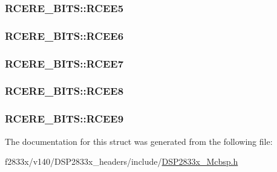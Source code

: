 \subsubsection[{R\+C\+E\+E5}]{ R\+C\+E\+R\+E\+\_\+\+B\+I\+T\+S\+::\+R\+C\+E\+E5}\label{struct_r_c_e_r_e___b_i_t_s_a806259ce4dbf29be106ef42cffc6e0e9}
\hypertarget{struct_r_c_e_r_e___b_i_t_s_a79c31d4b9794743b02e1fb5dcbc0279f}{}
\subsubsection[{R\+C\+E\+E6}]{ R\+C\+E\+R\+E\+\_\+\+B\+I\+T\+S\+::\+R\+C\+E\+E6}\label{struct_r_c_e_r_e___b_i_t_s_a79c31d4b9794743b02e1fb5dcbc0279f}
\hypertarget{struct_r_c_e_r_e___b_i_t_s_a16e0752fe213f6b96f243f046ed6b277}{}
\subsubsection[{R\+C\+E\+E7}]{ R\+C\+E\+R\+E\+\_\+\+B\+I\+T\+S\+::\+R\+C\+E\+E7}\label{struct_r_c_e_r_e___b_i_t_s_a16e0752fe213f6b96f243f046ed6b277}
\hypertarget{struct_r_c_e_r_e___b_i_t_s_a58bd59d712ea07a4440bec076b88b0f7}{}
\subsubsection[{R\+C\+E\+E8}]{ R\+C\+E\+R\+E\+\_\+\+B\+I\+T\+S\+::\+R\+C\+E\+E8}\label{struct_r_c_e_r_e___b_i_t_s_a58bd59d712ea07a4440bec076b88b0f7}
\hypertarget{struct_r_c_e_r_e___b_i_t_s_a38c00efe5afde95aa4b1c97ed66b8f0d}{}
\subsubsection[{R\+C\+E\+E9}]{ R\+C\+E\+R\+E\+\_\+\+B\+I\+T\+S\+::\+R\+C\+E\+E9}\label{struct_r_c_e_r_e___b_i_t_s_a38c00efe5afde95aa4b1c97ed66b8f0d}


The documentation for this struct was generated from the following file\+:\begin{DoxyCompactItemize}
\item 
f2833x/v140/\+D\+S\+P2833x\+\_\+headers/include/\hyperlink{_d_s_p2833x___mcbsp_8h}{D\+S\+P2833x\+\_\+\+Mcbsp.\+h}\end{DoxyCompactItemize}

